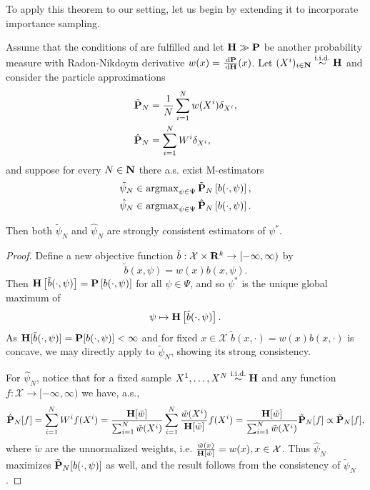 To apply this theorem to our setting, let us begin by extending it to incorporate importance sampling. 

\begin{proposition}
    \label{prop:is-consistency}
    Assume that the conditions of  are fulfilled and let $\H \gg \P$ be another probability measure with Radon-Nikdoym derivative $w(x) = \rnd{\P}{\H}(x)$. 
    Let $(X^{i})_{i \in \N} \iid \H$ and consider the particle approximations 
    \begin{align*}
        \tilde \P_{N} &= \frac{1}{N}\sum_{i = 1}^N w(X^{i})\delta_{X^{i}},  \\ 
        \hat \P_{N} &= \sum_{i = 1}^{N} W^{i} \delta_{X^{i}},
    \end{align*}
    and suppose for every $N\in\N$ there a.s. exist M-estimators
    \begin{align*}
    \tilde \psi_{N} &\in \argmax_{\psi \in \Psi} \tilde \P _{N} \left[ b(\cdot, \psi) \right],\\
    \hat \psi_{N} &\in \argmax_{\psi \in \Psi} \hat \P _{N} \left[ b(\cdot, \psi) \right].
    \end{align*}

    Then both $\tilde\psi_{N}$ and $\hat\psi_{N}$ are strongly consistent estimators of $\psi^{\ast}$.
\end{proposition}
\begin{proof}
    Define a new objective function $\tilde b : \mathcal X \times \R^{k} \to [-\infty, \infty)$ by 
    $$
    \tilde b(x, \psi) = w(x) b(x, \psi).
    $$
    Then $\H \left[ \tilde b(\cdot, \psi) \right] = \P \left[ b(\cdot, \psi) \right]$ for all $\psi\in\Psi$, and so $\psi^{\ast}$ is the unique global maximum of $$\psi \mapsto \H \left[ \tilde b(\cdot, \psi) \right].$$ 
    As $\H [\tilde b(\cdot, \psi)] = \P [b(\cdot, \psi)] < \infty$ and for fixed $x\in\mathcal X$ $\tilde b(x, \cdot) = w(x)b(x,\cdot)$ is concave, we may directly apply  to $\tilde\psi_{N}$, showing its strong consistency.

    For $\hat\psi_{N}$, notice that for a fixed sample $X^{1}, \dots, X^{N} \iid \H$ and any function $f: \mathcal X \to [-\infty, \infty)$ we have, a.s., 
    $$
        \hat \P _{N} [f] = \sum_{i = 1}^{N} W^{i} f(X^{i}) = \frac{\H [\tilde w]}{\sum_{i = 1}^N \tilde w(X^{i})} \sum_{i = 1}^{N} \frac{\tilde w(X^{i})}{\H[\tilde w]} f(X^{i}) = \frac{\H [\tilde w]}{\sum_{i = 1}^{N} \tilde w(X^{i})} \tilde \P _{N} [f] \propto \tilde \P_{N} [f],
    $$
    where $\tilde w$ are the unnormalized weights, i.e. $ \frac{\tilde w(x)}{\H [\tilde w]} = w(x), x \in\mathcal X$.
    Thus $\hat \psi_{N}$ maximizes $\tilde \P_{N} [b(\cdot, \psi)]$ as well, and the result follows from the consistency of $\tilde \psi_{N}$.
\end{proof}

